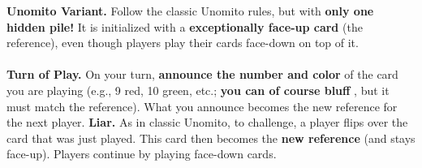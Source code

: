 \documentclass[a4paper]{memoir}
\begin{document}
{\footnotesize

\noindent
\textbf{ Unomito Variant.} Follow the classic Unomito rules, but with \textbf{only one hidden pile!} 
It is initialized with a \textbf{exceptionally face-up card} (the reference), even though players play their cards face-down on top of it.
\\
\\
\noindent
\textbf{ Turn of Play.} On your turn, \textbf{announce the number and color} of the card you are playing (e.g., 9 red, 10 green, etc.; \textbf{you can of course bluff} , but it must match the reference).
What you announce becomes the new reference for the next player.
\newpage
\noindent
\textbf{ Liar.} As in classic Unomito, to challenge, a player flips over the card that was just played.
This card then becomes the \textbf{new reference} (and stays face-up). Players continue by playing face-down cards.
}
\end{document}
